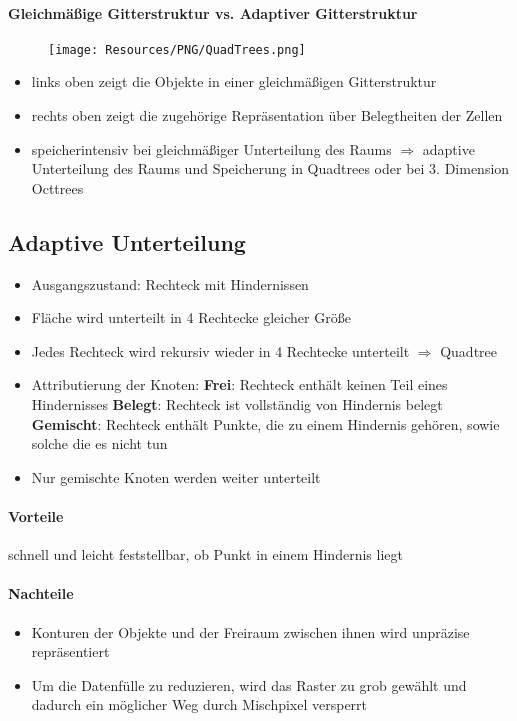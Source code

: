 \paragraph{Gleichmäßige Gitterstruktur vs. Adaptiver Gitterstruktur}
\begin{figure}[H]
	\begin{center}
		\texttt{[image: Resources/PNG/QuadTrees.png]}
		\caption{}
		\label{fig:PNG/QuadTrees.PNG}
	\end{center}
\end{figure}
\begin{itemize}
	\item links oben zeigt die Objekte in einer gleichmäßigen Gitterstruktur
	\item rechts oben zeigt die zugehörige Repräsentation über Belegtheiten der Zellen
	\item speicherintensiv bei gleichmäßiger Unterteilung des Raums $\Rightarrow$ adaptive Unterteilung des Raums und Speicherung in Quadtrees oder bei 3. Dimension Octtrees
\end{itemize}
\subsection{Adaptive Unterteilung}
\begin{itemize}
	\item Ausgangszustand: Rechteck mit Hindernissen
	\item Fläche wird unterteilt in 4 Rechtecke gleicher Größe
	\item Jedes Rechteck wird rekursiv wieder in 4 Rechtecke unterteilt $\Rightarrow$ Quadtree
	\item Attributierung der Knoten:
	\subitem \textbf{Frei}: Rechteck enthält keinen Teil eines Hindernisses
	\subitem \textbf{Belegt}: Rechteck ist vollständig von Hindernis belegt
	\subitem \textbf{Gemischt}: Rechteck enthält Punkte, die zu einem Hindernis gehören, sowie solche die es nicht tun
	\item Nur gemischte Knoten werden weiter unterteilt
\end{itemize}
\paragraph{Vorteile} schnell und leicht feststellbar, ob Punkt in einem Hindernis liegt
\paragraph{Nachteile}
\begin{itemize}
	\item Konturen der Objekte und der Freiraum zwischen ihnen wird unpräzise repräsentiert
	\item Um die Datenfülle zu reduzieren, wird das Raster zu grob gewählt und dadurch ein möglicher Weg durch Mischpixel versperrt
\end{itemize}

